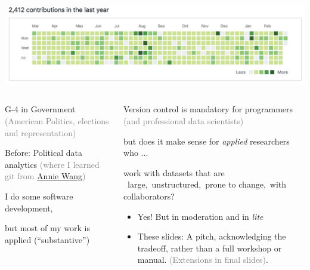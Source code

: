 \documentclass[ignorenonframetext, 10pt, aspectratio=169]{beamer}
\begin{document}
\begin{frame}
\centering
\includegraphics[width = 0.9\linewidth]{portfolio.png}
\maketitle
\end{frame}



\begin{frame}{}

\begin{columns}[T]

\begin{column}{0.4\textwidth}
\begin{wideitemize}
\item G-4 in Government \textcolor{gray}{(American Politics, elections and representation)}
\item Before: Political data analytics \textcolor{gray}{(where I learned git from \href{https://anniejw.com/}{Annie Wang})}
\end{wideitemize}\pause
\bigskip
\begin{wideitemize}
\item I do some software development,
\item but most of my work is applied (``substantive'')
\end{wideitemize}
\end{column}\pause
\begin{column}{0.6\textwidth}
\begin{wideitemize}
\item Version control is mandatory for programmers \textcolor{gray}{(and professional data scientists)}\pause
\item but does it make sense for \emph{applied} researchers who ...
\item work with datasets that are \pause ~\alert{large},\pause ~\alert{unstructured},\pause ~\alert{prone to change},\pause ~\alert{with collaborators}?
\end{wideitemize}\pause

\bigskip
{}

\begin{tcolorbox}
\begin{itemize}
\item[{}] Yes! But in moderation and in \emph{lite}
\item[{}] These slides: A pitch, acknowledging the tradeoff, \pause rather than a full workshop or manual. \textcolor{gray}{(Extensions in final slides)}.
\end{itemize}
\end{tcolorbox}
\end{column}
\end{columns}
\end{frame}
\end{document}
